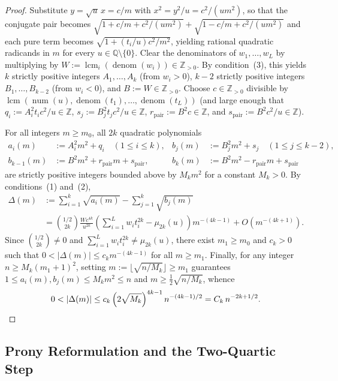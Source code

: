 \documentclass[11pt,a4paper]{article}
\theoremstyle{definition}
\theoremstyle{remark}
\newcommand{\QQ}{\mathbb{Q}}
\newcommand{\ZZ}{\mathbb{Z}}
\begin{document}
\begin{proof}
Substitute $y = \sqrt{u}\, x = c / m$ with $x^2 = y^2 / u = c^2 / (u m^2)$, so that the conjugate pair becomes $\sqrt{1 + c/m + c^2/(u m^2)} + \sqrt{1 - c/m + c^2/(u m^2)}$ and each pure term becomes $\sqrt{1 + (t_i/u) c^2 / m^2}$, yielding rational quadratic radicands in $m$ for every $u \in \QQ \setminus \{0\}$. Clear the denominators of $w_1, \dots, w_L$ by multiplying by $W := \operatorname{lcm}_i(\operatorname{denom}(w_i)) \in \ZZ_{>0}$. By condition~(3), this yields $k$ strictly positive integers $A_1, \dots, A_k$ (from $w_i > 0$), $k - 2$ strictly positive integers $B_1, \dots, B_{k-2}$ (from $w_i < 0$), and $B := W \in \ZZ_{>0}$. Choose $c \in \ZZ_{>0}$ divisible by $\operatorname{lcm}(\operatorname{num}(u), \operatorname{denom}(t_1), \dots, \operatorname{denom}(t_L))$ (and large enough that $q_i := A_i^2 t_i c^2 / u \in \ZZ$, $s_j := B_j^2 t_j c^2 / u \in \ZZ$, $r_{\mathrm{pair}} := B^2 c \in \ZZ$, and $s_{\mathrm{pair}} := B^2 c^2 / u \in \ZZ$).

For all integers $m \ge m_0$, all $2k$ quadratic polynomials
\begin{align*}
a_i(m) &:= A_i^2 m^2 + q_i \quad (1 \le i \le k), &
b_j(m) &:= B_j^2 m^2 + s_j \quad (1 \le j \le k - 2), \\
b_{k-1}(m) &:= B^2 m^2 + r_{\mathrm{pair}} m + s_{\mathrm{pair}}, &
b_k(m) &:= B^2 m^2 - r_{\mathrm{pair}} m + s_{\mathrm{pair}}
\end{align*}
are strictly positive integers bounded above by $M_k m^2$ for a constant $M_k > 0$. By conditions~(1) and~(2),
\begin{align*}
\Delta(m) &:= \sum_{i=1}^k \sqrt{a_i(m)} - \sum_{j=1}^k \sqrt{b_j(m)} \\
&= \binom{1/2}{2k} \frac{W c^{4k}}{u^{2k}} \left(\sum_{i=1}^L w_i t_i^{2k} - \mu_{2k}(u)\right) m^{-(4k - 1)} + O\!\left(m^{-(4k + 1)}\right).
\end{align*}
Since $\binom{1/2}{2k} \neq 0$ and $\sum_{i=1}^L w_i t_i^{2k} \neq \mu_{2k}(u)$, there exist $m_1 \ge m_0$ and $c_k > 0$ such that $0 < |\Delta(m)| \le c_k m^{-(4k - 1)}$ for all $m \ge m_1$. Finally, for any integer $n \ge M_k (m_1 + 1)^2$, setting $m := \lfloor \sqrt{n / M_k} \rfloor \ge m_1$ guarantees $1 \le a_i(m), b_j(m) \le M_k m^2 \le n$ and $m \ge \frac{1}{2} \sqrt{n / M_k}$, whence
\[
0 < |\Delta(m)| \le c_k \left(2 \sqrt{M_k}\right)^{4k - 1} n^{-(4k - 1)/2} = C_k \, n^{-2k + 1/2}. \qedhere
\]
\end{proof}

\subsection{Prony Reformulation and the Two-Quartic Step}
\end{document}
